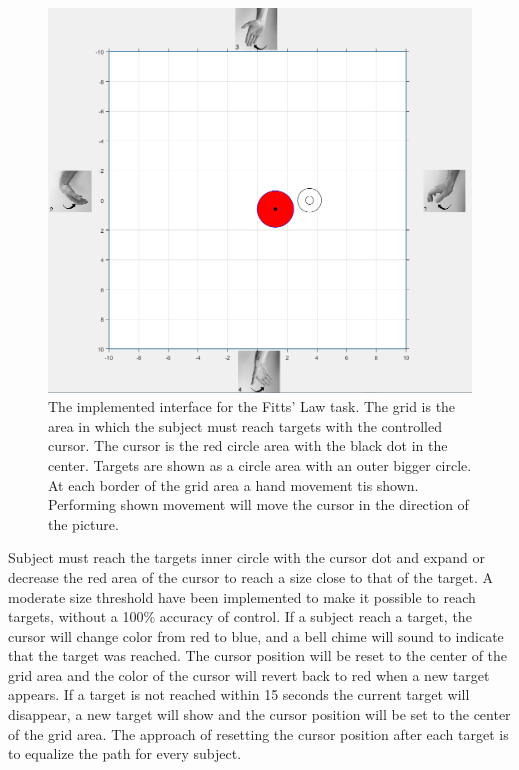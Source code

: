 \begin{figure}[H] 
	\includegraphics[width=1\textwidth]{figures/xBackground/perftestGUI}
	\caption{The implemented interface for the Fitts' Law task. The grid is the area in which the subject must reach targets with the controlled cursor. The cursor is the red circle area with the black dot in the center. Targets are shown as a circle area with an outer bigger circle. At each border of the grid area a hand movement tis shown. Performing shown movement will move the cursor in the direction of the picture.}
	\label{fig:fittsLawTask}
\end{figure}

Subject must reach the targets inner circle with the cursor dot and expand or decrease the red area of the cursor to reach a size close to that of the target. A moderate size threshold have been implemented to make it possible to reach targets, without a 100\% accuracy of control. If a subject reach a target, the cursor will change color from red to blue, and a bell chime will sound to indicate that the target was reached. The cursor position will be reset to the center of the grid area and the color of the cursor will revert back to red when a new target appears. If a target is not reached within 15 seconds the current target will disappear, a new target will show and the cursor position will be set to the center of the grid area. The approach of resetting the cursor position after each target is to equalize the path for every subject. 


